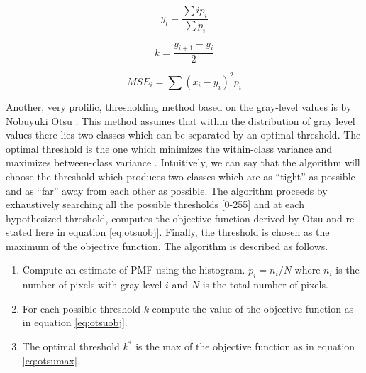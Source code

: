 \documentclass[journal]{IEEEtran}
\begin{document}
\begin{equation}
\label{eq:lloydmaxcent}
y_i = \frac{\sum{i p_i}}{\sum{p_i}}
\end{equation}

\begin{equation}
\label{eq:lloydmaxmidpoint}
k = \frac{y_{i+1}-y_i}{2}
\end{equation}

\begin{equation}
\label{eq:lloydmaxmse}
MSE_i=\sum(x_i-y_i)^2p_i
\end{equation}

\par Another, very prolific, thresholding method based on the gray-level values  is by Nobuyuki Otsu \cite{otsu}. This method assumes that within the distribution of gray level values there lies two classes which can be separated by an optimal threshold. The optimal threshold is the one which minimizes the within-class variance and maximizes between-class variance \cite{otsu}. Intuitively, we can say that the algorithm will choose the threshold which produces two classes which are as ``tight'' as possible and as ``far'' away from each other as possible. The algorithm proceeds by exhaustively searching all the possible thresholds [0-255] and at each hypothesized threshold, computes the objective function derived by Otsu and re-stated here in equation \ref{eq:otsuobj}. Finally, the threshold is chosen as the maximum of the objective function. The algorithm is described as follows.
\begin{enumerate}
\item Compute an estimate of PMF using the histogram. \begin{math}p_i = n_i/N\end{math} where \begin{math}n_i\end{math} is the number of pixels with gray level \begin{math}i\end{math} and \begin{math}N\end{math} is the total number of pixels.
\item For each possible threshold \begin{math}k\end{math} compute the value of the objective function as in equation \ref{eq:otsuobj}.
\item The optimal threshold \begin{math}k^*\end{math} is the max of the objective function as in equation \ref{eq:otsumax}.
\end{enumerate}
\end{document}

